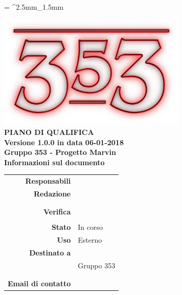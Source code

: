 \documentclass[openany, a4paper, 12pt]{report}
\begin{document}
	
	\tabulinesep = ^2.5mm_1.5mm
	
	\begin{titlepage}
		\centering
		\vfill
		{
			\bfseries
			\vskip2cm
			\includegraphics[width=9cm]{../../common/images/logo.png} \\
			\vfill
			\Huge{PIANO DI QUALIFICA}\\
			\vfill
			\Large Versione 1.0.0 in data 06-01-2018\\
			\large Gruppo 353 - Progetto Marvin\\
			\vfill
			\normalsize Informazioni sul documento\\
			\begin{table}[htbp]
				\centering
				\renewcommand\arraystretch{1.2}
				\begin{tabular}{r|l}
					\hline
					\textbf{Responsabili}	& \Parwinder \\
					
					\textbf{Redazione} 		& \Elena \\
											& \Gianluca \\
											& \Valentina \\
											
					\textbf{Verifica} 		& \Riccardo \\	
											& \Davide \\
											
					\textbf{Stato} 			& In corso\\
					\textbf{Uso}			& Esterno\\
					\textbf{Destinato a}   	& \Proponente\\
					& Gruppo 353\\
					& \Vardanega\\
					& \Cardin\\
					
					\textbf{Email di contatto}	& \mailgroup
				\end{tabular}
			\end{table}
			\vfill
		}    
	\end{titlepage}
	
	\tableofcontents
	\listoffigures
	\listoftables
	\newpage
	
	
	
	
	
	
	
	
	
	
	
	
\end{document}
